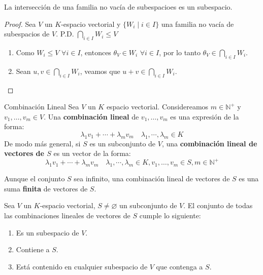 \begin{proposition}{}{}
    La intersección de una familia no vacía de subespacioes es un subespacio.
\end{proposition}

\begin{proof}
    Sea $V$ un $K$-espacio vectorial y $\{W_i \mid i \in I\}$ una familia no vacía de subespacios de $V$. P.D. $\bigcap_{i \in I} W_i \leq V$\\

    \begin{enumerate}
        \item Como $W_i \leq V \, \, \forall i \in I$, entonces $\theta_V \in W_i \, \, \forall i \in I$, por lo tanto $\theta_V \in \bigcap_{i \in I} W_i$.
        
        \item Sean $u,v \in \bigcap_{i \in I} W_i$, veamos que $u+v \in \bigcap_{i \in I} W_i$.\\
    \end{enumerate}
\end{proof}


\begin{definition}{Combinación Lineal}{}
    Sea $V$ un $K$ espacio vectorial. Considereamos $m \in \mathbb{N}^+$ y $v_1,\dots,v_m \in V$. Una \textbf{combinación lineal} de $v_1,\dots,v_m$ es una expresión de la forma:
    $$\lambda_1 v_1 + \cdots + \lambda_m v_m \quad \lambda_1, \cdots, \lambda_m \in K$$
    De modo más general, si $S$ es un subconjunto de $V$, una \textbf{combinación lineal de vectores de $S$} es un vector de la forma:
    $$\lambda_1 v_1 + \cdots + \lambda_m v_m \quad \lambda_1, \cdots, \lambda_m \in K, v_1,\dots,v_m \in S, m \in \mathbb{N}^+$$
\end{definition}
\begin{obs}{}{}
    Aunque el conjunto $S$ sea infinito, una combinación lineal de vectores de $S$ es una suma \textbf{finita} de vectores de $S$.
\end{obs}
\begin{proposition}
    Sea $V$ un $K$-espacio vectorial, $S \neq \varnothing$ un subconjunto de $V$. El conjunto de todas las combinaciones lineales de vectores de $S$ cumple lo siguiente:
    \begin{enumerate}[label=\alph*)]
        \item Es un subespacio de $V$.
        \item Contiene a $S$.
        \item Está contenido en cualquier subespacio de $V$ que contenga a $S$.
    \end{enumerate}
\end{proposition}


